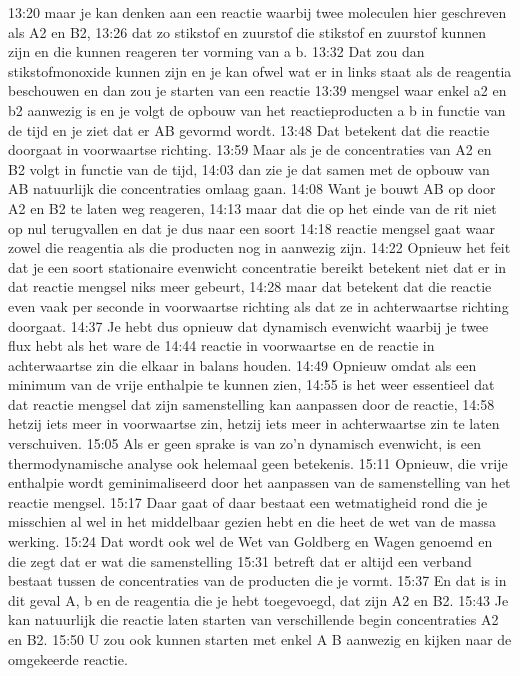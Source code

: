 13:20
maar je kan denken aan een reactie waarbij twee moleculen hier geschreven als A2 en B2,
13:26
dat zo stikstof en zuurstof die stikstof en zuurstof kunnen zijn en die kunnen reageren ter vorming van a b.
13:32
Dat zou dan stikstofmonoxide kunnen zijn en je kan ofwel wat er in links staat als de reagentia beschouwen en dan zou je starten van een reactie
13:39
mengsel waar enkel a2 en b2 aanwezig is en je volgt de opbouw van het reactieproducten a b in functie van de tijd en je ziet dat er AB gevormd wordt.
13:48
Dat betekent dat die reactie doorgaat in voorwaartse richting.
13:59
Maar als je de concentraties van A2 en B2 volgt in functie van de tijd,
14:03
dan zie je dat samen met de opbouw van AB natuurlijk die concentraties omlaag gaan.
14:08
Want je bouwt AB op door A2 en B2 te laten weg reageren,
14:13
maar dat die op het einde van de rit niet op nul terugvallen en dat je dus naar een soort
14:18
reactie mengsel gaat waar zowel die reagentia als die producten nog in aanwezig zijn.
14:22
Opnieuw het feit dat je een soort stationaire evenwicht concentratie bereikt betekent niet dat er in dat reactie mengsel niks meer gebeurt,
14:28
maar dat betekent dat die reactie even vaak per seconde in voorwaartse richting als dat ze in achterwaartse richting doorgaat.
14:37
Je hebt dus opnieuw dat dynamisch evenwicht waarbij je twee flux hebt als het ware de
14:44
reactie in voorwaartse en de reactie in achterwaartse zin die elkaar in balans houden.
14:49
Opnieuw omdat als een minimum van de vrije enthalpie te kunnen zien,
14:55
is het weer essentieel dat dat reactie mengsel dat zijn samenstelling kan aanpassen door de reactie,
14:58
hetzij iets meer in voorwaartse zin, hetzij iets meer in achterwaartse zin te laten verschuiven.
15:05
Als er geen sprake is van zo'n dynamisch evenwicht, is een thermodynamische analyse ook helemaal geen betekenis.
15:11
Opnieuw, die vrije enthalpie wordt geminimaliseerd door het aanpassen van de samenstelling van het reactie mengsel.
15:17
Daar gaat of daar bestaat een wetmatigheid rond die je misschien al wel in het middelbaar gezien hebt en die heet de wet van de massa werking.
15:24
Dat wordt ook wel de Wet van Goldberg en Wagen genoemd en die zegt dat er wat die samenstelling
15:31
betreft dat er altijd een verband bestaat tussen de concentraties van de producten die je vormt.
15:37
En dat is in dit geval A, b en de reagentia die je hebt toegevoegd, dat zijn A2 en B2.
15:43
Je kan natuurlijk die reactie laten starten van verschillende begin concentraties A2 en B2.
15:50
U zou ook kunnen starten met enkel A B aanwezig en kijken naar de omgekeerde reactie.
